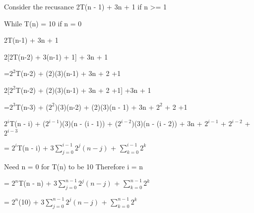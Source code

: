 \documentclass[letterpaper, 12pt]{artikel3}
\begin{document}
Consider the recusance 2T(n - 1) + 3n + 1 if n >= 1

While T(n) = 10 if n = 0
				
	2T(n-1) + 3n + 1
	
	2[2T(n-2) + 3(n-1) + 1] + 3n + 1
	
	=$2^2$T(n-2) + (2)(3)(n-1) + 3n + 2 +1
	
	2[$2^2$T(n-2) + (2)(3)(n-1) + 3n + 2 +1] +3n + 1
		
	=$2^3$T(n-3) + ($2^2$)(3)(n-2) + (2)(3)(n - 1) + 3n + $2^2$ + 2 +1
	
	$2^i$T(n - i) + ($2^{i - 1}$)(3)(n - (i - 1)) + ($2^{i - 2}$)(3)(n - (i - 2)) + 3n + $2^{i - 1}$ + $2^{i - 2}$ + $2^{i - 3}$
	
	= $2^i$T(n - i) + 3$\sum_{j = 0}^{i - 1}2^j(n-j)$ + $\sum_{k = 0}^{i-1}2^k$
	
			Need n = 0 for T(n) to be 10
			Therefore i = n
			
	= $2^n$T(n - n) + 3$\sum_{j = 0}^{n - 1}2^j(n-j)$ + $\sum_{k = 0}^{n-1}2^k$
	
	= $2^n$(10) + 3$\sum_{j = 0}^{n - 1}2^j(n-j)$ + $\sum_{k = 0}^{n-1}2^k$
\end{document}
